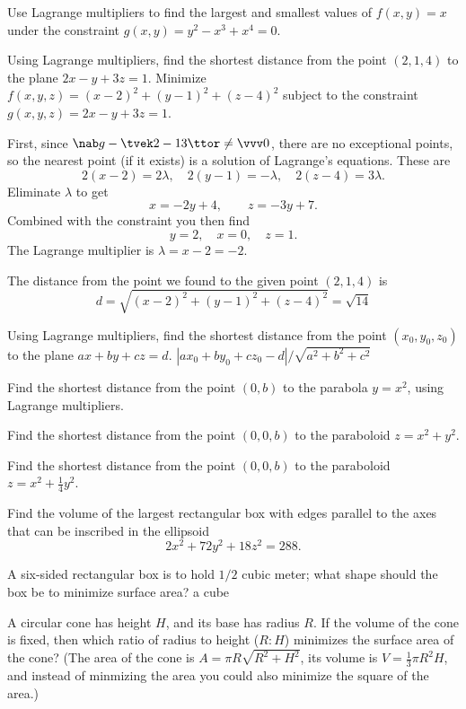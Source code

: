 \begin{multicols}{2}
\problem Use Lagrange multipliers to find the largest and 
smallest values of $f(x, y) = x$ under the constraint $g(x, y) =
y^2-x^3+x^4 = 0$.

\problem \subprob Using Lagrange multipliers, 
find the shortest distance from  the point $(2, 1, 4)$ to the plane
$2x-y+3z=1$.  
\answer  
Minimize $f(x, y, z) = (x-2)^2 + (y-1)^2 + (z-4)^2$ subject to the
constraint $g(x, y, z) = 2x-y+3z = 1$.

First, since $\nab g - \tvek 2 \\ -1 \\ 3\ttor \neq \vvv0$, there are
no exceptional points, so the nearest point (if it exists) is a
solution of Lagrange's equations.  These are
\[
2(x-2) = 2\lambda, \quad
2(y-1) = -\lambda, \quad
2(z-4) = 3\lambda.
\]
Eliminate $\lambda$ to get 
\[
x=-2y+4, \qquad 
z = -3y+7.
\]
Combined with the constraint you then find
\[
y= 2,\quad x=  0, \quad z= 1.
\]
The Lagrange multiplier is $\lambda = x-2 = -2$.

The distance from the point we found to the given point $(2, 1, 4)$ is
\[
d = \sqrt{(x-2)^2 + (y-1)^2 + (z-4)^2}  
=\sqrt{14}
\]
\endanswer

\subprob Using Lagrange multipliers, find the shortest distance from  
the point $(x_0,y_0,z_0)$ to the plane $ax+by+cz=d$.  
\answer   
$|ax_0+by_0+cz_0-d|/\sqrt{a^2+b^2+c^2}$
\endanswer


\problem 
\subprob Find the shortest distance from the point $(0,b)$ 
to the parabola  $y=x^2$,  using Lagrange multipliers.

\subprob Find the shortest distance from the point $(0,0,b)$ to the  
paraboloid $z=x^2+y^2$.

\subprob Find the shortest distance from the point $(0,0,b)$ to the  
paraboloid $z=x^2+\frac14y^2$.


\problem Find the volume of the largest rectangular box with edges parallel  
to the axes that can be inscribed in the ellipsoid $$2x^2+72y^2+18z^2=288.$$

\problem A six-sided rectangular box is to hold $1/2$ cubic meter; what  
shape should the box be to minimize surface area? 
\answer  a cube  
\endanswer

\problem A circular cone has height $H$, and its  
base has radius $R$.  If the volume of the cone is fixed, then which
ratio of radius to height ($R:H$) minimizes the surface area of the
cone?  (The area of the cone is $A = \pi R\sqrt{R^2+H^2}$, its volume
is $V=\frac13\pi R^2H$, and instead of minmizing the area you could
also minimize the square of the area.)


\end{multicols}
